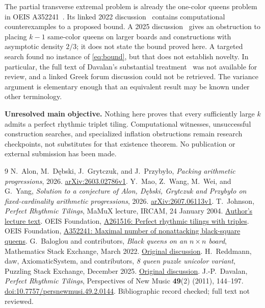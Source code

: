 \documentclass[11pt]{article}
\begin{document}
The partial transverse extremal problem is already the one-color queens problem in OEIS A352241~\cite{queensoeis}. Its linked 2022 discussion~\cite{queensmse} contains computational counterexamples to a proposed bound. A 2025 discussion~\cite{queenspuzzle} gives an obstruction to placing $k-1$ same-color queens on larger boards and constructions with asymptotic density $2/3$; it does not state the bound proved here. A targeted search found no instance of \eqref{eq:bound}, but that does not establish novelty. In particular, the full text of Davalan's substantial treatment~\cite{davalan} was not available for review, and a linked Greek forum discussion could not be retrieved. The variance argument is elementary enough that an equivalent result may be known under other terminology.

\medskip
\noindent\textbf{Unresolved main objective.} Nothing here proves that every sufficiently large $k$ admits a perfect rhythmic triplet tiling. Computational witnesses, unsuccessful construction searches, and specialized inflation obstructions remain research checkpoints, not substitutes for that existence theorem. No publication or external submission has been made.

\begin{thebibliography}{9}\small
{} N.~Alon, M.~D\k{e}bski, J.~Grytczuk, and J.~Przyby\l o, \emph{Packing arithmetic progressions}, 2026. \href{https://arxiv.org/abs/2603.02786}{arXiv:2603.02786v1}.
 Y.~Mao, Z.~Wang, M.~Wei, and G.~Yang, \emph{Solution to a conjecture of Alon, D\k{e}bski, Grytczuk and Przyby\l o on fixed-cardinality arithmetic progressions}, 2026. \href{https://arxiv.org/abs/2607.06113}{arXiv:2607.06113v1}.
 T.~Johnson, \emph{Perfect Rhythmic Tilings}, MaMuX lecture, IRCAM, 24 January 2004. \href{https://editions75.com/texts/Perfect_Rhythmic_Tilings.pdf}{Author's lecture text}.
 OEIS Foundation, \href{https://oeis.org/A261516}{A261516: Perfect rhythmic tilings with triples}.
 OEIS Foundation, \href{https://oeis.org/A352241}{A352241: Maximal number of nonattacking black-square queens}.
 G.~Baloglou and contributors, \emph{Black queens on an $n\times n$ board}, Mathematics Stack Exchange, March 2022. \href{https://math.stackexchange.com/questions/4397136/black-queens-on-n-times-n-board}{Original discussion}.
 H.~Reddmann, daw, AxiomaticSystem, and contributors, \emph{8 queen puzzle unicolor variant}, Puzzling Stack Exchange, December 2025. \href{https://puzzling.stackexchange.com/questions/135247/8-queen-puzzle-unicolor-variant}{Original discussion}.
 J.-P.~Davalan, \emph{Perfect Rhythmic Tilings}, Perspectives of New Music \textbf{49}(2) (2011), 144--197. \href{https://doi.org/10.7757/persnewmusi.49.2.0144}{doi:10.7757/persnewmusi.49.2.0144}. Bibliographic record checked; full text not reviewed.
\end{thebibliography}
\end{document}
